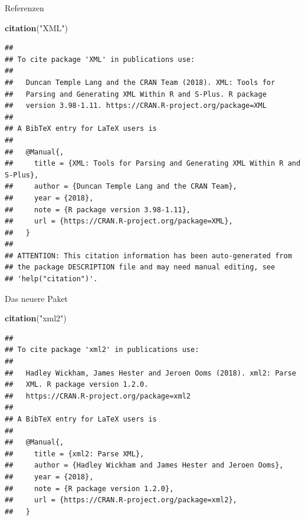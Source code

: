 \documentclass[ignorenonframetext,]{beamer}
\newenvironment{Shaded}{\begin{snugshade}}{\end{snugshade}}
\newcommand{\KeywordTok}[1]{\textcolor[rgb]{0.26,0.66,0.93}{\textbf{#1}}}
\newcommand{\NormalTok}[1]{\textcolor[rgb]{0.74,0.68,0.62}{#1}}
\newcommand{\StringTok}[1]{\textcolor[rgb]{0.02,0.61,0.04}{#1}}
\begin{document}
\begin{frame}[fragile]{Referenzen}
\protect\hypertarget{referenzen}{}

\begin{Shaded}
\begin{Highlighting}[]
\KeywordTok{citation}\NormalTok{(}\StringTok{"XML"}\NormalTok{)}
\end{Highlighting}
\end{Shaded}

\begin{verbatim}
## 
## To cite package 'XML' in publications use:
## 
##   Duncan Temple Lang and the CRAN Team (2018). XML: Tools for
##   Parsing and Generating XML Within R and S-Plus. R package
##   version 3.98-1.11. https://CRAN.R-project.org/package=XML
## 
## A BibTeX entry for LaTeX users is
## 
##   @Manual{,
##     title = {XML: Tools for Parsing and Generating XML Within R and S-Plus},
##     author = {Duncan Temple Lang and the CRAN Team},
##     year = {2018},
##     note = {R package version 3.98-1.11},
##     url = {https://CRAN.R-project.org/package=XML},
##   }
## 
## ATTENTION: This citation information has been auto-generated from
## the package DESCRIPTION file and may need manual editing, see
## 'help("citation")'.
\end{verbatim}

\end{frame}

\begin{frame}[fragile]{Das neuere Paket}
\protect\hypertarget{das-neuere-paket}{}

\begin{Shaded}
\begin{Highlighting}[]
\KeywordTok{citation}\NormalTok{(}\StringTok{"xml2"}\NormalTok{)}
\end{Highlighting}
\end{Shaded}

\begin{verbatim}
## 
## To cite package 'xml2' in publications use:
## 
##   Hadley Wickham, James Hester and Jeroen Ooms (2018). xml2: Parse
##   XML. R package version 1.2.0.
##   https://CRAN.R-project.org/package=xml2
## 
## A BibTeX entry for LaTeX users is
## 
##   @Manual{,
##     title = {xml2: Parse XML},
##     author = {Hadley Wickham and James Hester and Jeroen Ooms},
##     year = {2018},
##     note = {R package version 1.2.0},
##     url = {https://CRAN.R-project.org/package=xml2},
##   }
\end{verbatim}

\end{frame}
\end{document}
